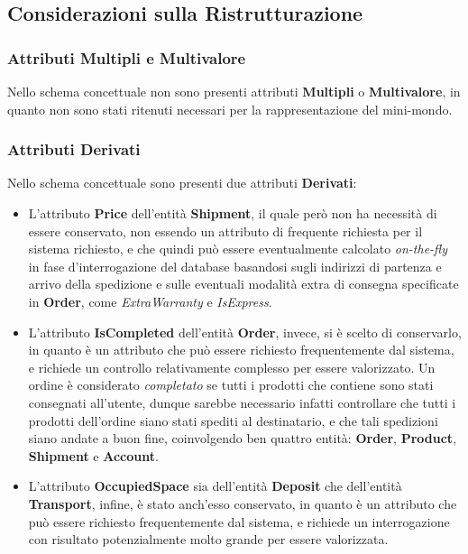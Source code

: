 \subsection{Considerazioni sulla Ristrutturazione}

\subsubsection{Attributi Multipli e Multivalore}

Nello schema concettuale non sono presenti attributi \textbf{Multipli} o \textbf{Multivalore}, in quanto non sono stati ritenuti necessari per la rappresentazione del mini-mondo.

\subsubsection{Attributi Derivati}

Nello schema concettuale sono presenti due attributi \textbf{Derivati}:

\begin{itemize}
  \item L'attributo \textbf{Price} dell'entità \textbf{Shipment}, il quale però non ha necessità di essere conservato, non essendo un attributo di frequente richiesta per il sistema richiesto, e che quindi può essere eventualmente calcolato \textit{on-the-fly} in fase d'interrogazione del database basandosi sugli indirizzi di partenza e arrivo della spedizione e sulle eventuali modalità extra di consegna specificate in \textbf{Order}, come \textit{ExtraWarranty} e \textit{IsExpress}.
  \item L'attributo \textbf{IsCompleted} dell'entità \textbf{Order}, invece, si è scelto di conservarlo, in quanto è un attributo che può essere richiesto frequentemente dal sistema, e richiede un controllo relativamente complesso per essere valorizzato. Un ordine è considerato \textit{completato} se tutti i prodotti che contiene sono stati consegnati all'utente, dunque sarebbe necessario infatti controllare che tutti i prodotti dell'ordine siano stati spediti al destinatario, e che tali spedizioni siano andate a buon fine, coinvolgendo ben quattro entità: \textbf{Order}, \textbf{Product}, \textbf{Shipment} e \textbf{Account}. %
  \item L'attributo \textbf{OccupiedSpace} sia dell'entità \textbf{Deposit} che dell'entità \textbf{Transport}, infine, è stato anch'esso conservato, in quanto è un attributo che può essere richiesto frequentemente dal sistema, e richiede un interrogazione con risultato potenzialmente molto grande per essere valorizzata. %
\end{itemize}

